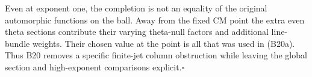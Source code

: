 Even at exponent one, the completion is not an equality of
the original automorphic functions on the ball.  Away from
the fixed CM point the extra even theta sections contribute
their varying theta-null factors and additional line-bundle
weights.  Their chosen value at the point is all that was
used in (B20a).  Thus B20 removes a specific finite-jet column
obstruction while leaving the global section and high-exponent
comparisons explicit.\hfill$\square$
